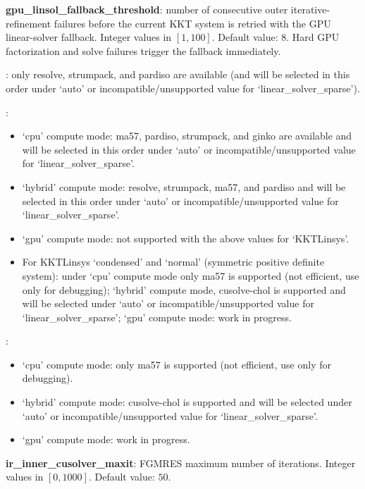 \noindent \textbf{gpu\_linsol\_fallback\_threshold}: number of consecutive outer iterative-refinement failures before the current KKT system is retried with the GPU linear-solver fallback. Integer values in $[1,100]$. Default value: $8$. Hard GPU factorization and solve failures trigger the fallback immediately.
\medskip

: only resolve, strumpack, and pardiso are available (and will be selected in this order under `auto' or incompatible/unsupported value for `linear\_solver\_sparse').

: 
\begin{itemize}
  \item `cpu' compute mode: ma57, pardiso, strumpack, and ginko are available and will be selected in this order under `auto' or incompatible/unsupported value for `linear\_solver\_sparse'.
  \item `hybrid' compute mode: resolve, strumpack, ma57, and pardiso and will be selected in this order under `auto' or incompatible/unsupported value for `linear\_solver\_sparse'.
  \item `gpu' compute mode: not supported with the above values for `KKTLinsys'.
  \item For KKTLinsys `condensed' and `normal' (symmetric positive definite system): under `cpu' compute mode only ma57 is supported (not efficient, use only for debugging); `hybrid' compute mode, cusolve-chol is supported and will be selected under `auto' or incompatible/unsupported value for `linear\_solver\_sparse'; `gpu' compute mode: work in progress.
\end{itemize}

: 
\begin{itemize}
  \item `cpu' compute mode: only ma57 is supported (not efficient, use only for debugging).
  \item `hybrid' compute mode: cusolve-chol is supported and will be selected under `auto' or incompatible/unsupported value for `linear\_solver\_sparse'.
  \item `gpu' compute mode: work in progress.
\end{itemize}

\noindent \textbf{ir\_inner\_cusolver\_maxit}: FGMRES maximum number of iterations. Integer values in $[0, 1000]$. Default value: $50$.
\medskip


